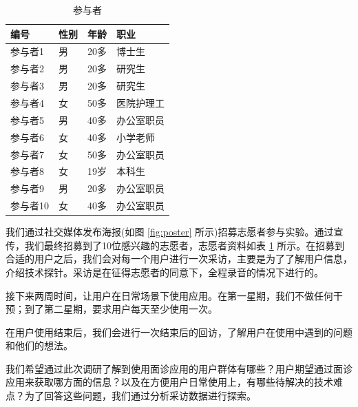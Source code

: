 \begin{table}
    \centering
    \begin{tabular}{llll}
          \toprule
          编号 &	性别 &	年龄 &	职业 \\
          \midrule
          参与者1 &	男 &	20多 &	博士生 \\
          参与者2 &	男 &	20多 &	研究生 \\
          参与者3 &	男 &	20多 &	研究生 \\
          参与者4 &	女 &	50多 &	医院护理工 \\
          参与者5 &	男 &	40多 &	办公室职员 \\
          参与者6 &	女 &	40多 &	小学老师 \\
          参与者7 &	女 &	50多 &	办公室职员 \\
          参与者8 &	女 &	19岁 &	本科生 \\
          参与者9 &	男 &	20多 &	办公室职员 \\
          参与者10 &	女 &	40多 &	办公室职员 \\
          \bottomrule
    \end{tabular}
    \caption{参与者}
    \label{tab:part}
  \end{table}
我们通过社交媒体发布海报(如图 \ref{fig:poster} 所示)招募志愿者参与实验。通过宣传，我们最终招募到了10位感兴趣的志愿者，志愿者资料如表 \ref{tab:part} 所示。在招募到合适的用户之后，我们会对每一个用户进行一次采访，主要是为了了解用户信息，介绍技术探针。采访是在征得志愿者的同意下，全程录音的情况下进行的。


接下来两周时间，让用户在日常场景下使用应用。在第一星期，我们不做任何干预；到了第二星期，要求用户每天至少使用一次。

在用户使用结束后，我们会进行一次结束后的回访，了解用户在使用中遇到的问题和他们的想法。

我们希望通过此次调研了解到使用面诊应用的用户群体有哪些？用户期望通过面诊应用来获取哪方面的信息？以及在方便用户日常使用上，有哪些待解决的技术难点？为了回答这些问题，我们通过分析采访数据进行探索。


